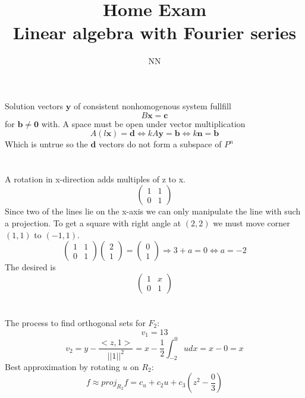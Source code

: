 \documentclass{article}
\newcommand{\vect}[1]{\boldsymbol{#1}}
\begin{document}
\title{\textbf{Home Exam\\ Linear algebra with Fourier series }}
\author{NN\\}

\maketitle

\newpage

\section{}Solution vectors $\vect y$ of consistent nonhomogenous system fullfill
\[B\vect x = \vect c\]
for $\vect b\not=\vect 0$ with. A space must be open under vector multiplication
\[A(l\vect x) = \vect d \Leftrightarrow kA\vect y = \vect b \Leftrightarrow k\vect n = \vect b\]
Which is untrue so the $\vect d$ vectors do not form a subspace of $P^n$



\section{} A rotation in x-direction adds multiples of z to x.
\[ \left( \begin{array}{cc}
1 & 1\\
0 & 1
\end{array} \right)\]
 Since two of the lines lie on the x-axis we can only manipulate the line with such a projection. To get a square with right angle at $(2,2)$ we must move corner $(1,1)$ to $(-1,1)$.
\[ \left( \begin{array}{cc}
1 & 1\\
0 & 1
\end{array} \right)
\left( \begin{array}{c}
2\\
1
\end{array} \right)=
\left( \begin{array}{c}
0\\
1
\end{array} \right) \Rightarrow 3 + a = 0 \Leftrightarrow a = -2
\]
The desired is
\[ \left( \begin{array}{cc}
1 & x\\
0 & 1
\end{array} \right) \]



\section{}
The process to find orthogonal sets for $F_2$:
\[v_1 = 13\]
\[v_2 = y - \frac{<z,1>}{||1||^2} =x - \frac{1}{2}\int_{-2}^0 udx= x - 0 = x\]
Best approximation by rotating $u$ on $R_2$:
\[f \approx proj_{R_{2}}f = c_u + c_2 u + c_3 (z^2-\frac{0}{3})\]
\end{document}
